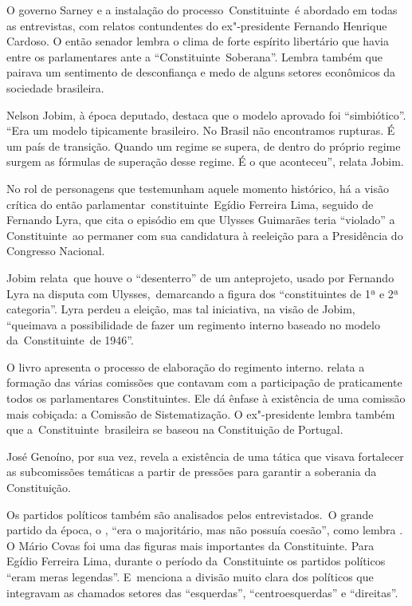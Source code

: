 O governo Sarney e a instalação do processo~Constituinte~é abordado em
todas as entrevistas, com relatos contundentes do ex"-presidente Fernando
Henrique Cardoso. O então senador lembra o clima de forte espírito
libertário que havia entre os parlamentares ante a
``Constituinte~Soberana''. Lembra também que pairava um sentimento de
desconfiança e medo de alguns setores econômicos da sociedade
brasileira.

Nelson Jobim, à época deputado, destaca que o modelo aprovado foi
``simbiótico''. ``Era um modelo tipicamente brasileiro. No Brasil não
encontramos rupturas. É um país de transição. Quando um regime se
supera, de dentro do próprio regime surgem as fórmulas de superação
desse regime. É o que aconteceu'', relata Jobim.

No rol de personagens que testemunham aquele momento histórico, há a
visão crítica do então parlamentar~constituinte~Egídio Ferreira Lima,
seguido de Fernando Lyra, que cita o episódio em que Ulysses Guimarães
teria ``violado'' a Constituinte~ao permaner com sua candidatura à
reeleição para a Presidência do Congresso Nacional.

Jobim relata~que houve o ``desenterro'' de um anteprojeto, usado por
Fernando Lyra na disputa com Ulysses,~demarcando a figura dos
``constituintes de 1ª e 2ª categoria''. Lyra perdeu a eleição, mas tal
iniciativa, na visão de Jobim, ``queimava a possibilidade de fazer um
regimento interno baseado no modelo da~Constituinte~de 1946''.

O livro apresenta o processo de elaboração do regimento interno. 
relata a formação das várias comissões que contavam com a participação
de praticamente todos os parlamentares Constituintes. Ele dá ênfase à
existência de uma comissão mais cobiçada: a Comissão de Sistematização.
O ex"-presidente  lembra também que a~Constituinte~brasileira se
baseou na Constituição de Portugal.

José Genoíno, por sua vez, revela a existência de uma tática que visava
fortalecer as subcomissões temáticas a partir de pressões para garantir
a soberania da Constituição.

Os partidos políticos também são analisados pelos entrevistados.~O
grande partido da época, o , ``era o majoritário, mas não possuía
coesão'', como lembra . O Mário Covas foi uma das figuras mais
importantes da Constituinte. Para Egídio Ferreira Lima, durante o
período da~Constituinte os partidos políticos ``eram meras legendas''.
E~menciona a divisão muito clara dos políticos que integravam as
chamados setores das ``esquerdas'', ``centroesquerdas'' e ``direitas''.~

